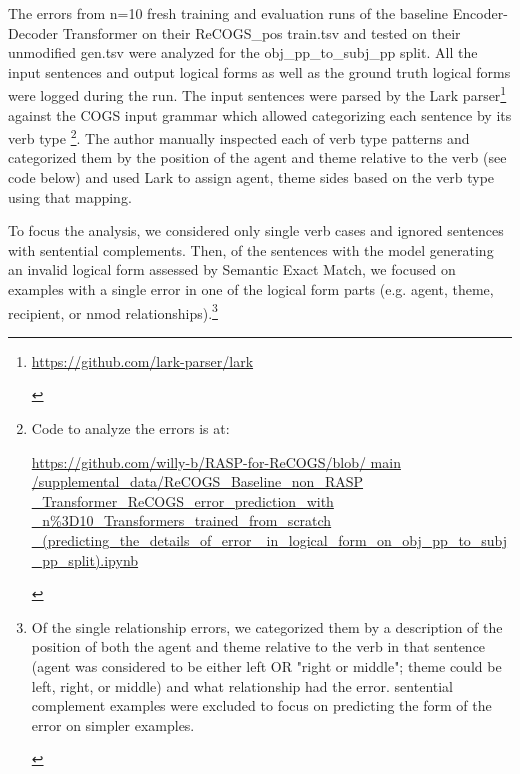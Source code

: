 \documentclass[11pt]{article}
\begin{document}
The errors from n=10 fresh training and evaluation runs of the baseline \citep{Wu2023} Encoder-Decoder Transformer on their ReCOGS\_pos train.tsv and tested on their unmodified gen.tsv were analyzed for the obj\_pp\_to\_subj\_pp split. All the input sentences and output logical forms as well as the ground truth logical forms were logged during the run. The input sentences were parsed by the Lark parser\footnote{\begin{footnotesize}\href{https://github.com/lark-parser/lark}{https://github.com/lark-parser/lark}\end{footnotesize}} against the COGS input grammar which allowed categorizing each sentence by its verb type \footnote{\begin{footnotesize}Code to analyze the errors is at: 

\href{https://github.com/willy-b/RASP-for-ReCOGS/blob/main/supplemental\_data/ReCOGS\_Baseline\_non\_RASP\_Transformer\_ReCOGS\_error\_prediction\_with\_n\%3D10\_Transformers\_trained\_from\_scratch\_(predicting\_the\_details\_of\_error\_in\_logical\_form\_on\_obj\_pp\_to\_subj\_pp\_split).ipynb}{https://github.com/willy-b/RASP-for-ReCOGS/blob/
main
/supplemental\_data/ReCOGS\_Baseline\_non\_RASP
\_Transformer\_ReCOGS\_error\_prediction\_with
\_n\%3D10\_Transformers\_trained\_from\_scratch
\_(predicting\_the\_details\_of\_error
\_in\_logical\_form\_on\_obj\_pp\_to\_subj
\_pp\_split).ipynb}

\end{footnotesize}}. The author manually inspected each of verb type patterns and categorized them by the position of the agent and theme relative to the verb (see code below) and used Lark to assign agent, theme sides based on the verb type using that mapping.

To focus the analysis, we considered only single verb cases and ignored sentences with sentential complements. Then, of the sentences with the model generating an invalid logical form assessed by Semantic Exact Match, we focused on examples with a single error in one of the logical form parts (e.g. agent, theme, recipient, or nmod relationships).\footnote{\begin{footnotesize}Of the single relationship errors, we categorized them by a description of the position of both the agent and theme relative to the verb in that sentence (agent was considered to be either left OR "right or middle"; theme could be left, right, or middle) and what relationship had the error. sentential complement examples were excluded to focus on predicting the form of the error on simpler examples.\end{footnotesize}}
\end{document}
